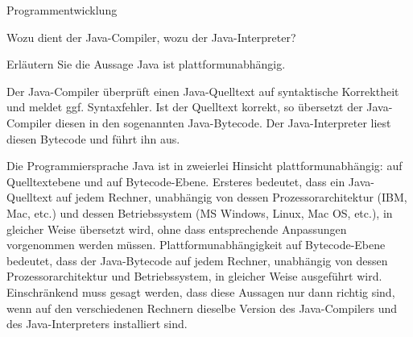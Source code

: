 \begin{exercise}{Programmentwicklung}
\begin{body}
\begin{parts}
\item Wozu dient der Java-Compiler, wozu der Java-Interpreter?
\item Erläutern Sie die Aussage \glqq Java ist plattformunabhängig.\grqq
\end{parts}
\end{body}

\begin{solution}
\begin{parts}
\item Der Java-Compiler überprüft einen Java-Quelltext auf syntaktische Korrektheit und meldet ggf. Syntaxfehler. Ist der Quelltext korrekt, so übersetzt der Java-Compiler diesen in den sogenannten Java-Bytecode. Der Java-Interpreter liest diesen Bytecode und führt ihn aus.

\item
Die Programmiersprache Java ist in zweierlei Hinsicht plattformunabhängig: auf Quelltextebene und auf Bytecode-Ebene. Ersteres bedeutet, dass ein Java-Quelltext auf jedem Rechner, unabhängig von dessen Prozessorarchitektur (IBM, Mac, etc.) und dessen Betriebssystem (MS Windows, Linux, Mac OS, etc.), in gleicher Weise übersetzt wird, ohne dass entsprechende Anpassungen vorgenommen werden müssen. Plattformunabhängigkeit auf Bytecode-Ebene bedeutet, dass der Java-Bytecode auf jedem Rechner, unabhängig von dessen Prozessorarchitektur und Betriebssystem, in gleicher Weise ausgeführt wird. Einschränkend muss gesagt werden, dass diese Aussagen nur dann richtig sind, wenn auf den verschiedenen Rechnern dieselbe Version des Java-Compilers und des Java-Interpreters installiert sind.
\end{parts}
\end{solution}
\end{exercise}
